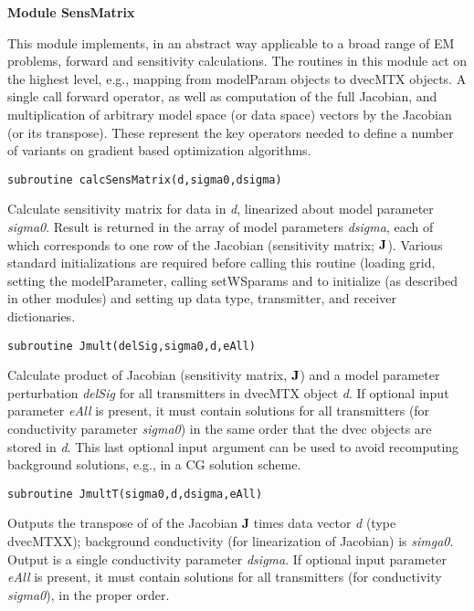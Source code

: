 \documentclass[12pt]{article}
\begin{document}
\vspace{10pt}

\noindent
{\bf Module SensMatrix}

This module implements, in an abstract way applicable
to a broad range of EM problems, forward and sensitivity 
calculations.  The routines in this module act on the
highest level, e.g., mapping from modelParam objects to dvecMTX
objects.  A single call forward operator, as well as
computation of the full Jacobian, and multiplication
of arbitrary model space (or data space)
vectors by the Jacobian (or its transpose).  These represent
the key operators needed to define a number of variants on
gradient based optimization algorithms.

\begin{verbatim}
subroutine calcSensMatrix(d,sigma0,dsigma)
\end{verbatim}

Calculate sensitivity matrix for data in {\it d}, linearized
about model parameter {\it sigma0}.  Result is returned
in the array of model parameters {\it dsigma}, each of which
corresponds to one row of the Jacobian (sensitivity matrix; $\bf J$).
Various standard initializations are required before calling
this routine (loading grid, setting the modelParameter, calling
setWSparams and    to initialize (as described in other modules)
and setting up data type, transmitter, and receiver dictionaries.

\begin{verbatim}
subroutine Jmult(delSig,sigma0,d,eAll)
\end{verbatim}

Calculate product of Jacobian (sensitivity matrix, $\bf J$)
and a model parameter perturbation {\it delSig}
for all transmitters in dvecMTX object {\it d}.
If optional input parameter {\it eAll} is present, it must contain
solutions for all transmitters (for conductivity parameter
{\it sigma0}) in the same order that the dvec objects are stored
in {\it d}.  This last optional input argument can be used to avoid
recomputing background solutions, e.g., in a CG solution scheme.

\begin{verbatim}
subroutine JmultT(sigma0,d,dsigma,eAll)
\end{verbatim}

Outputs the transpose of of the Jacobian
{\bf J} times data vector {\it d} (type dvecMTXX);
background conductivity (for linearization of Jacobian)
is {\it simga0}.   Output is a single conductivity 
parameter {\it dsigma}.
If optional input parameter {\it eAll} is present, it must contain
solutions for all transmitters (for conductivity {\it sigma0}),
in the proper order.
\end{document}
